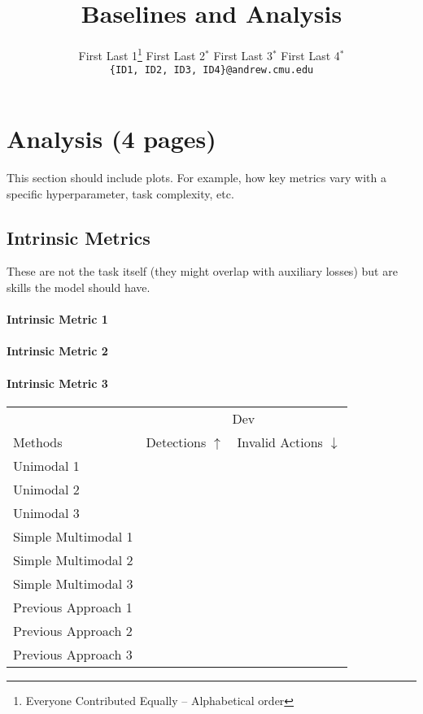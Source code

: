\documentclass[11pt,a4paper]{article}
\title{Baselines and Analysis}
\author{
  First Last 1\thanks{\hspace{4pt}Everyone Contributed Equally -- Alphabetical order} \hspace{2em} First Last 2$^*$ \hspace{2em} First Last 3$^*$ \hspace{2em} First Last 4$^*$ \\
  \texttt{\{ID1, ID2, ID3, ID4\}@andrew.cmu.edu}
  }
\date{}
\begin{document}
\maketitle

\section{Analysis (4 pages)}
This section should include plots.  For example, how key metrics vary with a specific hyperparameter, task complexity, etc.

\subsection{Intrinsic Metrics}
These are not the task itself (they might overlap with auxiliary losses) but are skills the model should have.

\paragraph{Intrinsic Metric 1}
\paragraph{Intrinsic Metric 2}
\paragraph{Intrinsic Metric 3}

\begin{table}[t]
\centering
\begin{tabular}{@{}lrr@{}}
\toprule
                            & \multicolumn{2}{c}{Dev} \\
Methods                     & Detections $\uparrow$ & Invalid Actions $\downarrow$  \\
\midrule
Unimodal 1 \cite{} & & \\
Unimodal 2 \cite{} & & \\
Unimodal 3 \cite{} & & \\
\midrule
Simple Multimodal 1 \cite{} & &  \\
Simple Multimodal 2 \cite{} & &  \\
Simple Multimodal 3 \cite{} & &  \\
\midrule
Previous Approach 1 \cite{} & &  \\
Previous Approach 2 \cite{} & &  \\
Previous Approach 3 \cite{} & &  \\
\bottomrule
\end{tabular}
\end{table}
\end{document}
